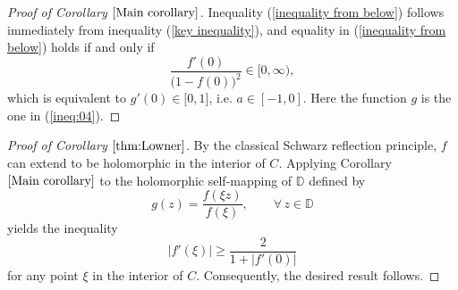 \documentclass{amsart}
\theoremstyle{definition}
\theoremstyle{remark}
\numberwithin{equation}{section}
\begin{document}
\begin{proof}[Proof of Corollary $\ref{Main corollary}$]
Inequality (\ref{inequality from below})  follows immediately from inequality (\ref{key inequality}), and equality in (\ref{inequality from below}) holds if and only if
$$\frac{f'(0)}{\big (1-f(0)\big)^2} \in [0, \infty),$$
which is equivalent to $g'(0)\in \mathbb [0, 1]$, i.e. $a\in [-1,0]$.
Here the function $g$ is the one in (\ref{ineq:04}).

\end{proof}


\begin{proof}[Proof of Corollary $\ref{thm:Lowner}$]
By the classical Schwarz reflection principle, $f$ can extend to be holomorphic in the interior of $C$. Applying Corollary $\ref{Main corollary}$ to the holomorphic self-mapping of $\mathbb D$ defined by
$$g(z)=\frac{f(\xi z)}{f(\xi)}, \qquad \forall\, z\in\mathbb D$$ yields the inequality $$|f'(\xi)|\geq\frac{2}{1+|f'(0)|}$$ for any point $\xi$ in the interior of $C$. Consequently, the desired result follows.
\end{proof}
\end{document}
